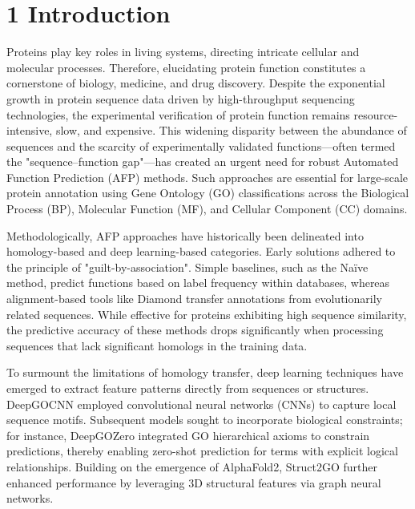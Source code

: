 \documentclass[unnumsec,webpdf,contemporary,large]{oup-authoring-template}%
\theoremstyle{thmstyleone}%
\theoremstyle{thmstyletwo}%
\theoremstyle{thmstylethree}%
\begin{document}
\maketitle

\section{1 Introduction}

Proteins play key roles in living systems, directing intricate cellular and molecular processes. Therefore, elucidating protein function constitutes a cornerstone of biology, medicine, and drug discovery\citep{eisenberg2000protein}. Despite the exponential growth in protein sequence data driven by high-throughput sequencing technologies, the experimental verification of protein function remains resource-intensive, slow, and expensive. This widening disparity between the abundance of sequences and the scarcity of experimentally validated functions—often termed the "sequence–function gap"—has created an urgent need for robust Automated Function Prediction (AFP)\citep{friedberg2006automated} methods. Such approaches are essential for large-scale protein annotation using Gene Ontology (GO)\citep{ashburner2000gene} classifications across the Biological Process (BP), Molecular Function (MF), and Cellular Component (CC) domains.

Methodologically, AFP approaches have historically been delineated into homology-based and deep learning-based categories. Early solutions adhered to the principle of "guilt-by-association". Simple baselines, such as the Naïve method\citep{kulmanov2020deepgoplus}, predict functions based on label frequency within databases, whereas alignment-based tools like Diamond\citep{diamond} transfer annotations from evolutionarily related sequences. While effective for proteins exhibiting high sequence similarity, the predictive accuracy of these methods drops significantly when processing sequences that lack significant homologs in the training data.

To surmount the limitations of homology transfer, deep learning techniques have emerged to extract feature patterns directly from sequences or structures. DeepGOCNN\citep{kulmanov2020deepgoplus} employed convolutional neural networks (CNNs)\citep{o2015introduction} to capture local sequence motifs. Subsequent models sought to incorporate biological constraints; for instance, DeepGOZero\citep{kulmanov2022deepgozero} integrated GO hierarchical axioms to constrain predictions, thereby enabling zero-shot prediction for terms with explicit logical relationships. Building on the emergence of AlphaFold2\citep{jumper2021highly}, Struct2GO\citep{jiao2023struct2go} further enhanced performance by leveraging 3D structural features via graph neural networks\citep{wu2020comprehensive}.
\end{document}
